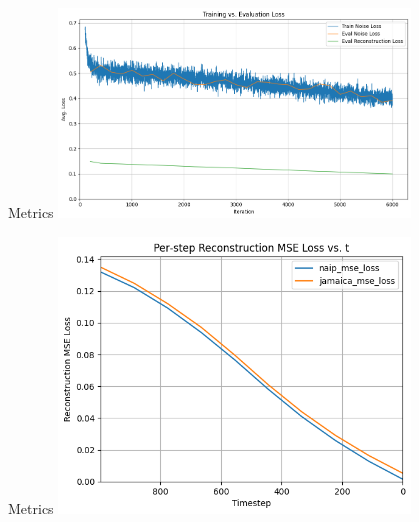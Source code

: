 \begin{frame}{Metrics}
  \centering
  \includegraphics[height=0.7\textheight,width=0.7\textwidth,keepaspectratio]{images/diff4_loss.png}
\end{frame}

\begin{frame}{Metrics}
  \centering
  \includegraphics[height=0.7\textheight,width=0.7\textwidth,keepaspectratio]{images/diff4_reconstruct.png}
\end{frame}

